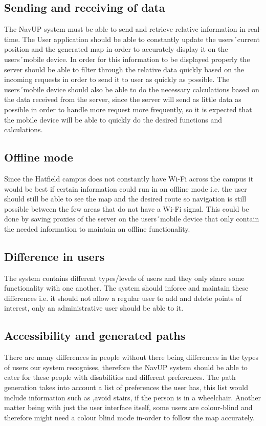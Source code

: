 \documentclass[english]{article}
\begin{document}
	\subsection{Sending and receiving of data}
The NavUP system must be able to send and retrieve relative information in real-time. The User application should be able to constantly update the users\' \ current position and the generated map in order to accurately display it on the users\' \ mobile device. In order for this information to be displayed properly the server should be able to filter through the relative data quickly based on the incoming requests in order to send it to user as quickly as possible. The users\' \ mobile device should also be able to do the necessary calculations based on the data received from the server, since the server will send as little data as possible in order to handle more request more frequently, so it is expected that the mobile device will be able to quickly do the desired functions and calculations. 
	\subsection{Offline mode}
Since the Hatfield campus does not constantly have Wi-Fi across the campus it would be best if certain information could run in an offline mode i.e. the user should still be able to see the map and the desired route so navigation is still possible between the few areas that do not have a Wi-Fi signal. This could be done by saving proxies of the server on the users\' \ mobile device that only contain the needed information to maintain an offline functionality.
	\subsection{Difference in users}
The system contains different types/levels of users and they only share some functionality with one another. The system should inforce and maintain these differences i.e. it should not allow a regular user to add and delete points of interest, only an administrative user should be able to it. 
	\subsection{Accessibility and generated paths}
There are many differences in people without there being differences in the types of users our system recognises, therefore the NavUP system should be able to cater for these people with disabilities and different preferences. The path generation takes into account a list of preferences the user has, this list would include information such as ,avoid stairs,  if the person is in a wheelchair. Another matter being with just the user interface itself, some users are colour-blind and therefore might need a colour blind mode in-order to follow the map accurately.  
\end{document}
